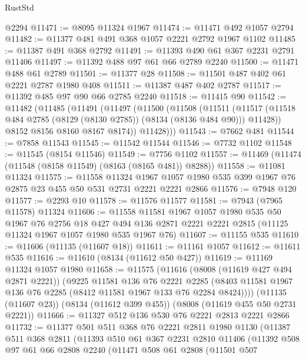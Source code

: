 \begin{lexlean}{RustStd}
\begin{coremodule}
{\begin{coremodule}
{{{{{{{{{{{{{{{{{{{{{{{{{{{{{{{{{{{{{{{{{{{{{{{{{{{{{    @2294
@11471 := @8095 @11324 @1967
@11474 := @11471 @492 @1057 @2794
@11482 := @11377 @481 @491 @368 @1057 @2221 @2792 @1967 @1102
@11485 := @11387 @491 @368 @2792
@11491 := @11393 @490 @61 @367 @2231 @2791 @11406
@11497 := @11392 @488 @97 @61 @66 @2789 @2240
@11500 := @11471 @488 @61 @2789
@11501 := @11377 @28
@11508 := @11501 @487 @402 @61 @2221 @2787 @1980 @408
@11511 := @11387 @487 @402 @2787
@11517 := @11392 @485 @97 @90 @66 @2785 @2240
@11518 := @11415 @90
@11542 := @11482
    (@11485
      (@11491
        (@11497
          (@11500
            (@11508
              (@11511
                (@11517 (@11518 @484 @2785 (@8129 (@8130 @2785)) (@8134 (@8136 @484 @90))) @11428))
              @8152
              @8156
              @8160
              @8167
              @8174))
          @11428)))
@11543 := @7662 @481
@11544 := @7858 @11543
@11545 := @11542 @11544
@11546 := @7732 @1102
@11548 := @11545 (@8154 @11546)
@11549 := @7756 @1102
@11557 := @11469 (@11474 (@11548 (@8158 @11549) (@8163 (@8165 @481)) @8288))
@11558 := @11081 @11324
@11575 := @11558
    @11324
    @1967
    @1057
    @1980
    @535
    @399
    @1967
    @76
    @2875
    @23
    @455
    @50
    @531
    @2731
    @2221
    @2221
    @2866
@11576 := @7948 @120
@11577 := @2293 @10
@11578 := @11576 @11577
@11581 := @7943 (@7965 @11578) @11324
@11606 := @11558
    @11581
    @1967
    @1057
    @1980
    @535
    @50
    @1967
    @76
    @2756
    @18
    @427
    @494
    @136
    @2871
    @2221
    @2221
    @2815
    (@11125 @11324 @1967 @1057 @1980 @535 @1967 @76)
@11607 := @11155 @535
@11610 := @11606 (@11135 (@11607 @18))
@11611 := @11161 @1057
@11612 := @11611 @535
@11616 := @11610 (@8134 (@11612 @50 @427))
@11619 := @11169 @11324 @1057 @1980
@11658 := @11575
    (@11616
      (@8008 (@11619 @427 @494 @2871 @2221))
      (@9225
        @11581
        @136
        @76
        @2221
        @2285
        (@8403 @11581 @1967 @136 @76 @2285 (@8412 @11581 @1967 @133 @76 @2284 @8424))))
    (@11135 (@11607 @23))
    (@8134 (@11612 @399 @455))
    (@8008 (@11619 @455 @50 @2731 @2221))
@11666 := @11327 @512 @136 @530 @76 @2221 @2813 @2221 @2866
@11732 := @11377
    @501
    @511
    @368
    @76
    @2221
    @2811
    @1980
    @1130
    (@11387
      @511
      @368
      @2811
      (@11393
        @510
        @61
        @367
        @2231
        @2810
        @11406
        (@11392
          @508
          @97
          @61
          @66
          @2808
          @2240
          (@11471
            @508
            @61
            @2808
            (@11501
              @507
}}}}}}}}}}}}}}}}}}}}}}}}}}}}}}}}}}}}}}}}}}}}}}}}}}}}}
\end{coremodule}}
\end{coremodule}
\end{lexlean}
